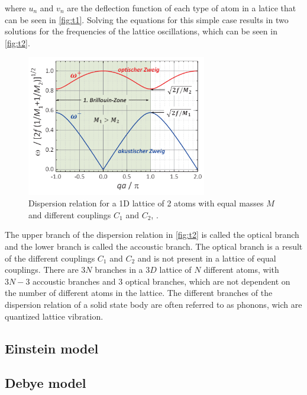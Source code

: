 where $u_n$ and $v_n$ are the deflection function of each type of atom in a latice that can be seen in \autoref{fig:t1}.
Solving the equations for this simple case results in two solutions for the frequencies of the lattice oscillations, which can be seen in \autoref{fig:t2}.
\begin{figure}[H]
    \centering
    \includegraphics[width=0.7\textwidth]{dispersion.pdf}
    \caption{Dispersion relation for a 1D lattice of 2 atoms with equal masses $M$ and different couplings $C_1$ and $C_2$, \cite{rehab}.}
    \label{fig:t2}
\end{figure}
\noindent
The upper branch of the dispersion relation in \autoref{fig:t2} is called the optical branch and the lower branch is called the accoustic branch. The optical branch is a result of the different couplings $C_1$ and $C_2$ and is not present in a lattice of equal couplings. There are $3N$ branches in a $3D$ lattice of $N$ different atoms, with $3N-3$ accoustic branches and $3$ optical branches, which are not dependent on the number of different atoms in the lattice.
The different branches of the dispersion relation of a solid state body are often referred to as phonons, wich are quantized lattice vibration. 

\subsection{Einstein model}
\subsection{Debye model}



\newpage
